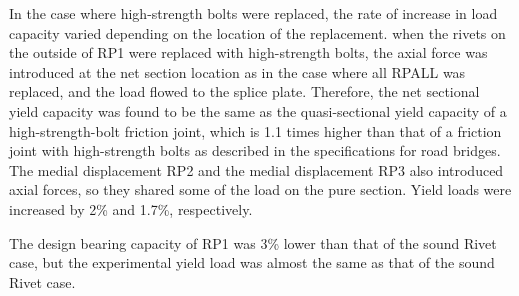 In the case where high-strength bolts were replaced, the rate of increase in load capacity varied depending on the location of the replacement. when the rivets on the outside of RP1 were replaced with high-strength bolts, the axial force was introduced at the net section location as in the case where all RPALL was replaced, and the load flowed to the splice plate. Therefore, the net sectional yield capacity was found to be the same as the quasi-sectional yield capacity of a high-strength-bolt friction joint, which is 1.1 times higher than that of a friction joint with high-strength bolts as described in the specifications for road bridges. The medial displacement RP2 and the medial displacement RP3 also introduced axial forces, so they shared some of the load on the pure section. Yield loads were increased by 2\% and 1.7\%, respectively.

The design bearing capacity of RP1 was 3\% lower than that of the sound Rivet case, but the experimental yield load was almost the same as that of the sound Rivet case.

